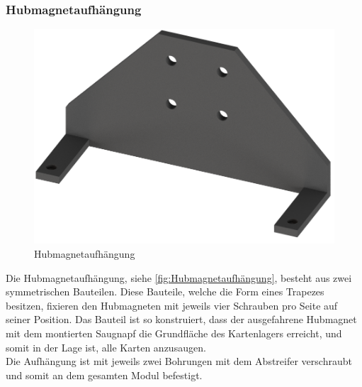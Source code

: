 \subsubsection{Hubmagnetaufhängung}
\begin{figure}
    \includegraphics[width=8 cm]{fig/mech/AufhaengungHubmahgnet}
    \caption{Hubmagnetaufhängung}
    \label{fig:Hubmagnetaufhängung}
\end{figure}
Die Hubmagnetaufhängung, siehe \autoref{fig:Hubmagnetaufhängung}, besteht aus zwei symmetrischen Bauteilen.
Diese Bauteile, welche die Form eines Trapezes besitzen, fixieren den Hubmagneten mit jeweils vier Schrauben pro Seite auf seiner Position.
Das Bauteil ist so konstruiert, dass der ausgefahrene Hubmagnet mit dem montierten Saugnapf die Grundfläche des Kartenlagers erreicht, und somit in der Lage ist,
alle Karten anzusaugen.\\
Die Aufhängung ist mit jeweils zwei Bohrungen mit dem Abstreifer verschraubt und somit an dem gesamten Modul befestigt.



